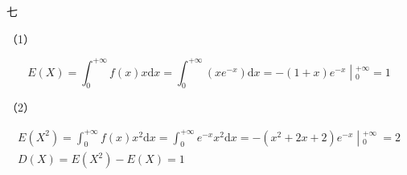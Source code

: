 \documentclass[UTF-8]{ctexart}
\begin{document}
七

（1）


\begin{equation*}
E( X) =\int _{0}^{+\infty } f( x) x\mathrm{d} x=\int _{0}^{+\infty }\left( xe^{-x}\right)\mathrm{d} x=\left. -( 1+x) e^{-x}\middle| _{0}^{+\infty }\right. =1
\end{equation*}


（2）


\begin{gather*}
E\left( X^{2}\right) =\int _{0}^{+\infty } f( x) x^{2}\mathrm{d} x=\int _{0}^{+\infty } e^{-x} x^{2}\mathrm{d} x=\left. -\left( x^{2} +2x+2\right) e^{-x}\middle| _{0}^{+\infty } \ \right. =2\\
D( X) =E\left( X^{2}\right) -E( X) =1
\end{gather*}
\end{document}
